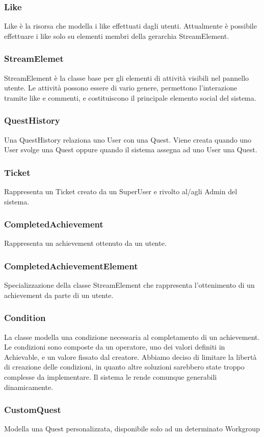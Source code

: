 \subsubsection{Like} Like è la risorsa che modella i like effettuati dagli utenti. Attualmente
è possibile effettuare i like solo su elementi membri della gerarchia StreamElement.
\subsubsection{StreamElemet}StreamElement è la classe base per gli elementi di attività visibili nel pannello utente. Le attività possono essere di vario genere, permettono l'interazione tramite like e commenti, e costituiscono il principale elemento social del sistema.
\subsubsection{QuestHistory} Una QuestHistory relaziona uno User con una Quest. Viene creata
quando uno User svolge una Quest oppure quando il sistema assegna ad uno User una Quest.
\subsubsection{Ticket}Rappresenta un Ticket creato da un SuperUser e rivolto al/agli Admin del sistema.
\subsubsection{CompletedAchievement}Rappresenta un achievement ottenuto da un utente.
\subsubsection{CompletedAchievementElement}Specializzazione della classe StreamElement che rappresenta l'ottenimento di un achievement da parte di un utente.
\subsubsection{Condition}La classe modella una condizione necessaria al completamento di un achievement. Le condizioni sono composte da un operatore, uno dei valori definiti in Achievable, e un valore fissato dal creatore. Abbiamo deciso di limitare la libertà di creazione delle condizioni, in quanto altre soluzioni sarebbero state troppo complesse da implementare. Il sistema le rende comunque generabili dinamicamente.
\subsubsection{CustomQuest}Modella una Quest personalizzata, disponibile solo ad un determinato Workgroup
